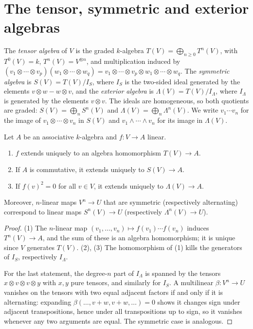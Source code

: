 \section{The tensor, symmetric and exterior algebras}\label{multilinear-algebra:section-algebras}

\begin{definition}\label{multilinear-algebra:definition-tensor-algebra}
The \emph{tensor algebra} of $V$ is the graded $k$-algebra $T(V) = \bigoplus_{n \geq 0} T^n(V)$, with
$T^0(V) = k$, $T^n(V) = V^{\otimes n}$, and multiplication induced by
$(v_1 \otimes \cdots \otimes v_p)(w_1 \otimes \cdots \otimes w_q) = v_1 \otimes \cdots \otimes v_p \otimes w_1 \otimes \cdots \otimes w_q$. The \emph{symmetric
algebra} is $S(V) = T(V)/I_S$, where $I_S$ is the two-sided ideal generated by the elements
$v \otimes w - w \otimes v$, and the \emph{exterior algebra} is $\Lambda(V) = T(V)/I_\Lambda$, where $I_\Lambda$ is
generated by the elements $v \otimes v$. The ideals are homogeneous, so both quotients are graded:
$S(V) = \bigoplus_n S^n(V)$ and $\Lambda(V) = \bigoplus_n \Lambda^n(V)$. We write $v_1 \cdots v_n$ for the image of
$v_1 \otimes \cdots \otimes v_n$ in $S(V)$ and $v_1 \wedge \cdots \wedge v_n$ for its image in $\Lambda(V)$.
\end{definition}

\begin{proposition}\label{multilinear-algebra:proposition-universal-algebras}
Let $A$ be an associative $k$-algebra and $f \colon V \to A$ linear.
\begin{enumerate}
\item $f$ extends uniquely to an algebra homomorphism $T(V) \to A$.
\item If $A$ is commutative, it extends uniquely to $S(V) \to A$.
\item If $f(v)^2 = 0$ for all $v \in V$, it extends uniquely to $\Lambda(V) \to A$.
\end{enumerate}
Moreover, $n$-linear maps $V^n \to U$ that are symmetric (respectively alternating) correspond to linear maps
$S^n(V) \to U$ (respectively $\Lambda^n(V) \to U$).
\end{proposition}

\begin{proof}
(1) The $n$-linear map $(v_1, \ldots, v_n) \mapsto f(v_1) \cdots f(v_n)$ induces $T^n(V) \to A$, and the sum of these is an
algebra homomorphism; it is unique since $V$ generates $T(V)$. (2), (3) The homomorphism of (1) kills the
generators of $I_S$, respectively $I_\Lambda$.

For the last statement, the degree-$n$ part of $I_\Lambda$ is spanned by the tensors
$x \otimes v \otimes v \otimes y$ with $x, y$ pure tensors, and similarly for $I_S$. A multilinear $\beta \colon V^n \to U$
vanishes on the tensors with two equal adjacent factors if and only if it is alternating: expanding
$\beta(\ldots, v + w, v + w, \ldots) = 0$ shows it changes sign under adjacent transpositions, hence under all
transpositions up to sign, so it vanishes whenever any two arguments are equal. The symmetric case is
analogous.
\end{proof}


